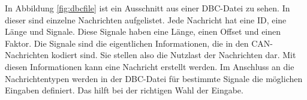 In Abbildung \ref{fig:dbcfile} ist ein Ausschnitt aus einer DBC-Datei zu sehen.
In dieser sind einzelne Nachrichten aufgelistet. Jede Nachricht hat eine ID, eine Länge und Signale. Diese Signale
haben eine Länge, einen Offset und einen Faktor. Die Signale sind die eigentlichen Informationen, die in den CAN-Nachrichten
kodiert sind. Sie stellen also die Nutzlast der Nachrichten dar. Mit diesen Informationen kann eine Nachricht erstellt werden.
Im Anschluss an die Nachrichtentypen werden in der DBC-Datei für bestimmte Signale die möglichen Eingaben definiert.
Das hilft bei der richtigen Wahl der Eingabe. 